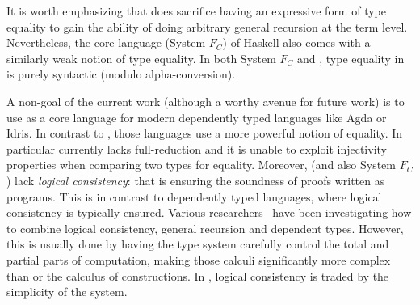 It is worth emphasizing that \name does sacrifice having an expressive form
of type equality to gain the ability of doing arbitrary general
recursion at the term level.  Nevertheless, 
the core language (System $F_{C}$) of Haskell also comes with a similarly weak
notion of type equality.  In both System $F_{C}$ and \name, type
equality in \name is purely syntactic (modulo alpha-conversion).

A non-goal of the current work (although a worthy avenue for future
work) is to use \name as a core language for modern dependently typed
languages like Agda or Idris. In contrast to \name, those languages
use a more powerful notion of equality. In particular \name
currently lacks full-reduction and it is unable to exploit injectivity 
properties when comparing two types for equality. Moreover,
\name (and also System $F_{C}$) lack \emph{logical consistency}:
that is ensuring the soundness of proofs written as programs.
This is in contrast to dependently typed languages, where logical
consistency is typically ensured.
Various researchers~\cite{zombie:popl14,zombie:thesis,Swamy2011} have been investigating how to combine logical
consistency, general recursion and dependent types. However, this is
usually done by having the type system carefully control the total and
partial parts of computation, making those calculi significantly more
complex than \name or the calculus of constructions. In
\name, logical consistency is traded by the simplicity of the system.

\begin{comment}
In particular
the treatment of type-level computation in \name shares similar ideas
with Haskell. Although Haskell's surface language provides a rich set
of mechanisms to do type-level computation~\cite{}, the core language
lacks fundamental mechanisms todo type-level computation. Type
equality in System $F_{C}$ is, like in \name, purely syntactic (modulo
alpha-conversion).
\end{comment}

\begin{comment}
 and there is no type-level
abstraction. In other words in Haskell, mechanisms such as type
classes and type families

Although it may seem that forcing each step of computation 
at the type-level to be explicit will prevent convinient use of 
type-level computation.

Point about the treatment of type-level computation in Haskell. Haskell's
core language has type applications, but no type-level lambda. Equality 
is syntactic modulo alpha-conversion. This design choice was rooted in the 
desire to support Hindley-Milner type-inference... 
\end{comment}

